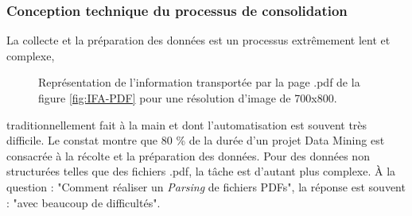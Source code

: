 	\subsubsection{Conception technique du processus de consolidation}\label{parser}
	\par
	La collecte et la préparation des données est un processus extrêmement lent et complexe,			\begin{figure}
						    		
						    		\caption{Représentation de l'information transportée par la page .pdf de la figure \ref{fig:IFA-PDF} pour une résolution d'image de 700x800.}
						    		\label{fig:charplot}
				\end{figure}  traditionnellement fait à la main et dont l'automatisation est souvent très difficile.
Le constat montre que 80 \% de la durée d'un projet Data Mining est consacrée à la récolte et la préparation des données\cite{DP}. Pour des données non structurées telles que des fichiers .pdf, la tâche est d'autant plus complexe. À la question : "Comment réaliser un \textit{Parsing} de fichiers PDFs", la réponse est souvent : "avec beaucoup de difficultés".

